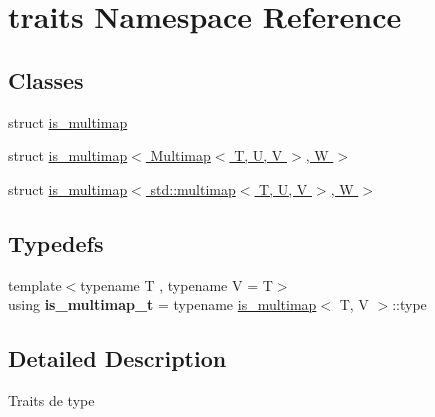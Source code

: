 \hypertarget{namespacetraits}{}\section{traits Namespace Reference}
\label{namespacetraits}
\subsection*{Classes}
\begin{DoxyCompactItemize}
\item 
struct \hyperlink{structtraits_1_1is__multimap}{is\+\_\+multimap}
\item 
struct \hyperlink{structtraits_1_1is__multimap_3_01Multimap_3_01T_00_01U_00_01V_01_4_00_01W_01_4}{is\+\_\+multimap$<$ Multimap$<$ T, U, V $>$, W $>$}
\item 
struct \hyperlink{structtraits_1_1is__multimap_3_01std_1_1multimap_3_01T_00_01U_00_01V_01_4_00_01W_01_4}{is\+\_\+multimap$<$ std\+::multimap$<$ T, U, V $>$, W $>$}
\end{DoxyCompactItemize}
\subsection*{Typedefs}
\begin{DoxyCompactItemize}
\item 
\mbox{\label{namespacetraits_a01e5b63ca6c09e48cdbdf814cbe498cc}} 
{\footnotesize template$<$typename T , typename V  = T$>$ }\\using {\bfseries is\+\_\+multimap\+\_\+t} = typename \hyperlink{structtraits_1_1is__multimap}{is\+\_\+multimap}$<$ T, V $>$\+::type
\end{DoxyCompactItemize}


\subsection{Detailed Description}
Traits de type 